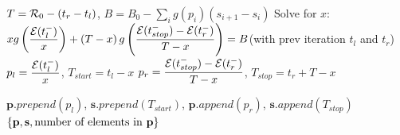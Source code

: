 \begin{algorithm}
\begin{algorithmic}[1]
	\State $T=\mathcal{R}_0-(t_r-t_l)$, $B=B_0-\displaystyle\sum_{i}g(p_i)(s_{i+1}-s_{i})$
	\State Solve for  $x$: $xg\left(\dfrac{\mathcal{E}(t_{l}^-)}{x}\right)+\left(T-x\right) g 		\left(\dfrac{\mathcal{E}(t_{stop}^-)-\mathcal{E}(t_{r}^-)}{T-x}\right) = B$(with prev iteration $t_l$ and $t_r$)\label{algo_solve_eqn}
	\State $p_l=\dfrac{\mathcal{E}(t_{l}^-)}{x}$, $T_{start}=t_l-x$
	\State $p_r=\dfrac{\mathcal{E}(t_{stop}^-)-\mathcal{E}(t_{r}^-)}{T-x}$, $T_{stop}=t_r+T-x$
\EndIf

\State $\textbf{p}.prepend(p_l)$, $\textbf{s}.prepend(T_{start})$, $\textbf{p}.append(p_r)$, $\textbf{s}.append(T_{stop})$
\State \Return $\{\textbf{p},\textbf{s}, \text{number of elements in \textbf{p}}\}$ 	 
\end{algorithmic}
\end{algorithm}


